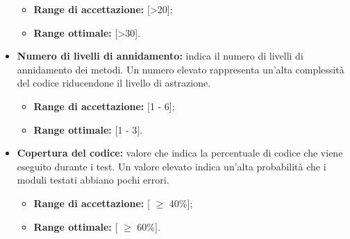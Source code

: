 \begin{itemize}
\begin{itemize}
		\item \textbf{Range di accettazione:} [>20];
		\item \textbf{Range ottimale:} [>30].
	\end{itemize}
	\item \textbf{Numero di livelli di annidamento:} indica il numero di livelli di annidamento dei metodi. Un numero elevato rappresenta un'alta complessità del codice riducendone il livello di astrazione.
	\begin{itemize}
		\item \textbf{Range di accettazione:} [1 - 6];
		\item \textbf{Range ottimale:} [1 - 3].
	\end{itemize}
	\item \textbf{Copertura del codice:} valore che indica la percentuale di codice che viene eseguito durante i test.
	Un valore elevato indica un'alta probabilità che i moduli testati abbiano pochi errori.
	\begin{itemize}
		\item \textbf{Range di accettazione:} [ $\geq$ 40\%];
		\item \textbf{Range ottimale:} [ $\geq$ 60\%].
	\end{itemize}
\end{itemize}

